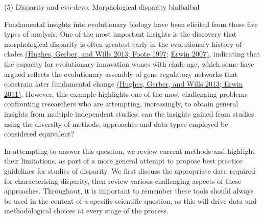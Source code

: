 (5) Disparity and evo-devo. Morphological disparity blalbalbal

Fundamental insights into evolutionary biology have been elicited from these five types of analysis.
One of the most important insights is the discovery that morphological disparity is often greatest early in the evolutionary history of clades \href{https://paperpile.com/c/sTGYvp/xxh5+yqPw}{(Hughes, Gerber, and Wills 2013; Foote 1997;} \href{https://paperpile.com/c/sTGYvp/EPJ2}{Erwin 2007)}, indicating that the capacity for evolutionary innovation wanes with clade age, which some have argued reflects the evolutionary assembly of gene regulatory networks that constrain later fundamental change \href{https://paperpile.com/c/sTGYvp/xxh5+Z6l6}{(Hughes, Gerber, and Wills 2013; Erwin 2011)}.
However, this example highlights one of the most challenging problems confronting researchers who are attempting, increasingly, to obtain general insights from multiple independent studies: can the insights gained from studies using the diversity of methods, approaches and data types employed be considered equivalent?

In attempting to answer this question, we review current methods and highlight their limitations, as part of a more general attempt to propose best practice guidelines for studies of disparity.
We first discuss the appropriate data required for characterising disparity, then review various challenging aspects of these approaches.
Throughout, it is important to remember these tools should always be used in the context of a specific scientific question, as this will drive data and methodological choices at every stage of the process.

